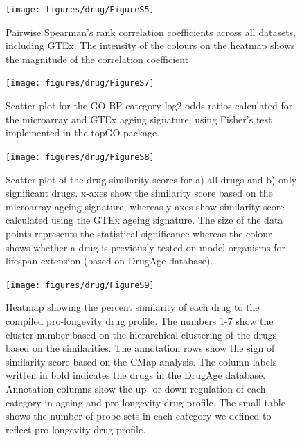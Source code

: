 \documentclass[12pt,twoside]{unicam}
\begin{document}
\begin{figure}

{\centering \texttt{[image: figures/drug/FigureS5]} 

}

\caption[Pairwise correlations across all datasets]{Pairwise Spearman's rank correlation coefficients across all datasets, including GTEx. The intensity of the colours on the heatmap shows the magnitude of the correlation coefficient}\label{fig:drugFigS5}
\end{figure}

\begin{figure}

{\centering \texttt{[image: figures/drug/FigureS7]} 

}

\caption[GO BP Category enrichment score distributions for ageing signatures]{Scatter plot for the GO BP category log2 odds ratios calculated for the microarray and GTEx ageing signature, using Fisher's test implemented in the topGO package.}\label{fig:drugFigS7}
\end{figure}

\begin{figure}

{\centering \texttt{[image: figures/drug/FigureS8]} 

}

\caption[Correlation between CMap results generated using the microarray and GTEx ageing signatures]{Scatter plot of the drug similarity scores for a) all drugs and b) only significant drugs. x-axes show the similarity score based on the microarray ageing signature, whereas y-axes show similarity score calculated using the GTEx ageing signature. The size of the data points represents the statistical significance whereas the colour shows whether a drug is previously tested on model organisms for lifespan extension (based on DrugAge database).}\label{fig:drugFigS8}
\end{figure}

\begin{figure}

{\centering \texttt{[image: figures/drug/FigureS9]} 

}

\caption[Heatmap showing the percent similarity of each drug to the compiled pro-longevity drug profile.]{Heatmap showing the percent similarity of each drug to the compiled pro-longevity drug profile. The numbers 1-7 show the cluster number based on the hierarchical clustering of the drugs based on the similarities. The annotation rows show the sign of similarity score based on the CMap analysis. The column labels written in bold indicates the drugs in the DrugAge database. Annotation columns show the up- or down-regulation of each category in ageing and pro-longevity drug profile. The small table shows the number of probe-sets in each category we defined to reflect pro-longevity drug profile.}\label{fig:drugFigS9}
\end{figure}
\end{document}
